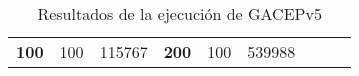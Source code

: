 \begin{table}[H]
\begin{tabular}{|ccrccrccc}
\multicolumn{1}{|c|}{\multirow{-39}{*}{\cellcolor[HTML]{FFFFC7}\textbf{100}}} & \multicolumn{1}{c|}{\multirow{-9}{*}{\cellcolor[HTML]{DDFDFF}100}} & \multicolumn{1}{r|}{\cellcolor[HTML]{DAE8FC}115767}    & \multicolumn{1}{c|}{\multirow{-39}{*}{\cellcolor[HTML]{FFFFC7}\textbf{200}}} & \multicolumn{1}{c|}{\multirow{-10}{*}{\cellcolor[HTML]{DDFDFF}100}} & \multicolumn{1}{r|}{\cellcolor[HTML]{DDFDFF}539988}    &                                                                              &                                                                    &                                                        \\ \cline{1-6}
\end{tabular}
\caption{\label{res:GACEPv5}Resultados de la ejecución de GACEPv5}
\end{table}


